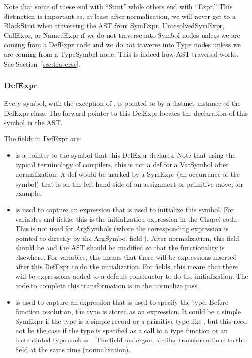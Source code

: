 \documentclass[10pt]{article}
\begin{document}
Note that some of these end with ``Stmt'' while others end with
``Expr.''  This distinction is important as, at least after
normalization, we will never get to a BlockStmt when traversing the
AST from SymExpr, UnresolvedSymExpr, CallExpr, or NamedExpr if we do
not traverse into Symbol nodes unless we are coming from a DefExpr
node and we do not traverse into Type nodes unless we are coming from
a TypeSymbol node.  This is indeed how AST traversal works.  See
Section~\ref{sec:traverse}.

\subsubsection{DefExpr}
\label{sec:defexpr}

Every symbol, with the exception of , is pointed to by
a distinct instance of the DefExpr class.  The forward pointer to this
DefExpr locates the declaration of this symbol in the AST.

The fields in DefExpr are:
\begin{itemize}
\item {} is a pointer to the symbol that this DefExpr
  declares.  Note that using the typical terminology of compilers,
  this is not a def for a VarSymbol after normalization.  A def would
  be marked by a SymExpr (an occurrence of the symbol) that is on the
  left-hand side of an assignment or primitive move, for example.
\item {} is used to capture an expression that is used to
  initialize this symbol.  For variables and fields, this is the
  initialization expression in the Chapel code.  This is not used for
  ArgSymbols (where the corresponding expression is pointed to
  directly by the ArgSymbol field ).  After
  normalization, this field should be  and the AST should be
  modified so that the functionality is elsewhere.  For variables,
  this means that there will be expressions inserted after this
  DefExpr to do the initialization.  For fields, this means that there
  will be expressions added to a default constructor to do the
  initialization.  The code to complete this transformation is in the
  normalize pass.
\item {} is used to capture an expression that is
  used to specify the type.  Before function resolution, the type is
  stored as an expression.  It could be a simple SymExpr if the type
  is a simple record  or a primitive type like , but
  this need not be the case if the type is specified as a call to a
  type function or an instantiated type such as .  The
   field undergoes similar transformations to the
   field at the same time (normalization).
\end{itemize}
\end{document}

